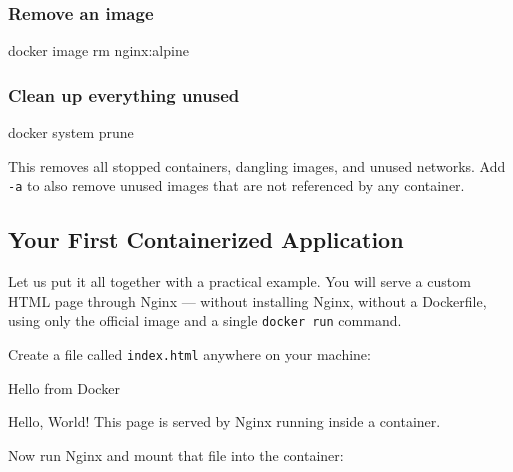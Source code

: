 \documentclass[11pt,american,a4paper,openany]{book}
\newenvironment{Shaded}{}{}
\newcommand{\NormalTok}[1]{#1}
\begin{document}
\subsubsection{Remove an image}\label{remove-an-image}

\begin{Shaded}
\begin{Highlighting}[]
\NormalTok{docker image rm nginx:alpine}
\end{Highlighting}
\end{Shaded}

\subsubsection{Clean up everything
unused}\label{clean-up-everything-unused}

\begin{Shaded}
\begin{Highlighting}[]
\NormalTok{docker system prune}
\end{Highlighting}
\end{Shaded}

This removes all stopped containers, dangling images, and unused
networks. Add \texttt{-a} to also remove unused images that are not
referenced by any container.

\subsection{Your First Containerized
Application}\label{your-first-containerized-application}

Let us put it all together with a practical example. You will serve a
custom HTML page through Nginx --- without installing Nginx, without a
Dockerfile, using only the official image and a single
\texttt{docker\ run} command.

Create a file called \texttt{index.html} anywhere on your machine:

\begin{Shaded}
\begin{Highlighting}[]

\NormalTok{  Hello from Docker}
  
\NormalTok{    Hello, World!}
\NormalTok{    This page is served by Nginx running inside a container.}
  
\end{Highlighting}
\end{Shaded}

Now run Nginx and mount that file into the container:
\end{document}
